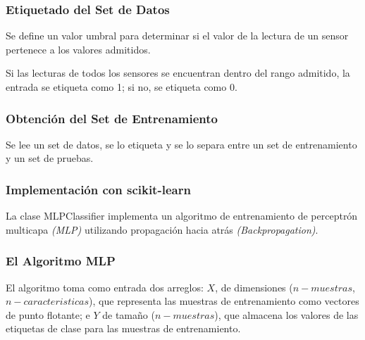 \documentclass{beamer}
\begin{document}
    \begin{frame}
        \frametitle{Etiquetado del Set de Datos}
        \hspace*{20pt}Se define un valor umbral para determinar si el valor de la lectura de un sensor pertenece a los valores admitidos.
        \vspace*{5pt}
        
        \vspace*{10pt}
        \hspace*{20pt}Si las lecturas de todos los sensores se encuentran dentro del rango admitido, la entrada se etiqueta como 1; si no, se etiqueta como 0.
        \vspace*{5pt}

        \resizebox{11cm}{!}{
            
        }
    \end{frame} 

    \begin{frame}
        \frametitle{Obtención del Set de Entrenamiento}
        \hspace*{20pt}Se lee un set de datos, se lo etiqueta y se lo separa entre un set de entrenamiento y un set de pruebas.
        \vspace*{10pt}

        \resizebox{11cm}{!}{
            
        }

    \end{frame}   


    \begin{frame}
        \frametitle{Implementación con scikit-learn}

        \hspace*{20pt}La clase MLPClassifier implementa un algoritmo de entrenamiento de perceptrón 
        multicapa \textit{(MLP)} utilizando propagación hacia atrás \textit{(Backpropagation)}.
        \vspace*{10pt}

        \resizebox{10cm}{!}{
            
        }



    \end{frame}

    \begin{frame}
        \frametitle{El Algoritmo MLP}
        \hspace*{20pt}El algoritmo toma como entrada dos arreglos: $X$, de dimensiones ($n-muestras$, $n-caracteristicas$), 
        que representa las muestras de entrenamiento como vectores de punto flotante; e $Y$ de tamaño ($n-muestras$), 
        que almacena los valores de las etiquetas de clase para las muestras de entrenamiento.
        \vspace*{10pt}

        \resizebox{10cm}{!}{
            
        }


    \end{frame}
\end{document}
